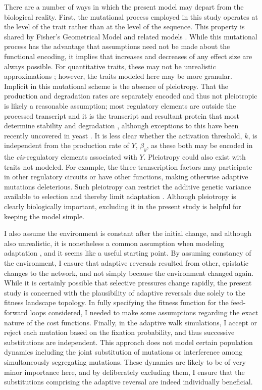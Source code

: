 \documentclass[dvips,12pt,twoside,titlepage]{article}
\begin{document}
There are a number of ways in which the present model may depart from the biological reality.
First, the mutational process employed in this study operates at the level of the trait rather than at the level of the sequence. 
This property is shared by Fisher's Geometrical Model and related models \cite{Fisher:1930qy,Martin:2006p1459}. 
While this mutational process has the advantage that assumptions need not be made about the functional encoding, it implies that increases and decreases of any effect size are always possible.
For quantitative traits, these may not be unrealistic approximations \cite{hansen2006an}; however, the traits modeled here may be more granular. 
Implicit in this mutational scheme is the absence of pleiotropy.
That the production and degradation rates are separately encoded and thus not pleiotropic is likely a reasonable assumption; most regulatory elements are outside the processed transcript \cite{Maston:2006hb} and it is the transcript and resultant protein that most determine stability and degradation \cite{Ross:1996ur,Garneau:2007kq}, although exceptions to this have been recently uncovered in yeast \cite{Bregman:2011cn,Depristo:2007co,Shalem:2011eo,Trcek:2011jpa}. It is less clear whether the activation threshold, $k$, is independent from the production rate of $Y$, $\beta_y$, as these both may be encoded in the \emph{cis}-regulatory elements associated with $Y$.
Pleiotropy could also exist with traits not modeled. 
For example, the three transcription factors may participate in other regulatory circuits or have other functions, making otherwise adaptive mutations deleterious. 
Such pleiotropy can restrict the additive genetic variance available to selection and thereby limit adaptation \cite{doi:10.1146/annurev.ecolsys.110308.120232}.
Although pleiotropy is clearly biologically important, excluding it in the present study is helpful for keeping the model simple.

I also assume the environment is constant after the initial change, and although also unrealistic, it is nonetheless a common assumption when modeling adaptation \cite{Orr:2005p1460}, and it seems like a useful starting point. 
By assuming constancy of the environment, I ensure that adaptive reversals resulted from other, epistatic changes to the network, and not simply because the environment changed again.
While it is certainly possible that selective pressures change rapidly, the present study is concerned with the plausibility of adaptive reversals due solely to the fitness landscape topology.
In fully specifying the fitness function for the feed-forward loops considered, I needed to make some assumptions regarding the exact nature of the cost functions. 
Finally, in the adaptive walk simulations, I accept or reject each mutation based on the fixation probability, and thus successive substitutions are independent. 
This approach does not model certain population dynamics including the joint substitution of mutations or interference among simultaneously segregating mutations.
These dynamics are likely to be of very minor importance here, and by deliberately excluding them, I ensure that the substitutions comprising the adaptive reversal are indeed individually beneficial.
\end{document}

